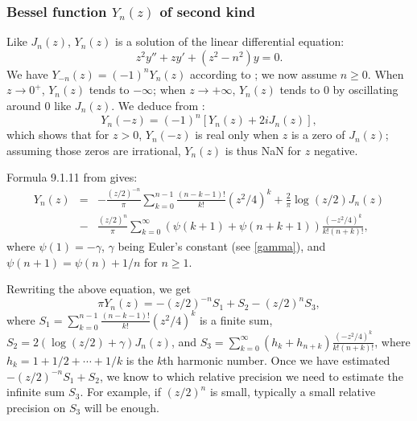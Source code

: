 \documentclass[12pt]{amsart}
\begin{document}
\subsubsection{Bessel function $Y_n(z)$ of second kind}

Like $J_n(z)$, $Y_n(z)$ is a solution of the linear differential equation:
\[ z^2 y'' + z y' + (z^2-n^2) y = 0. \]
We have $Y_{-n}(z) = (-1)^n Y_n(z)$ according to \cite[Eq.~(9.1.5)]{AbSt73};
we now assume $n \geq 0$.
When $z \rightarrow 0^+$, $Y_n(z)$ tends to $-\infty$; when $z \rightarrow
+\infty$, $Y_n(z)$ tends to $0$ by oscillating around $0$ like $J_n(z)$.
We deduce from \cite[Eq.~(9.23)]{Temme96}:
\[ Y_n(-z) = (-1)^n [Y_n(z) + 2 i J_n(z)], \]
which shows that for $z > 0$, $Y_n(-z)$ is real only when $z$ is a zero of
$J_n(z)$; assuming those zeros are irrational, $Y_n(z)$ is thus NaN for
$z$ negative.

Formula 9.1.11 from \cite{AbSt73} gives:
\begin{eqnarray*}
Y_n(z) &=& -\frac{(z/2)^{-n}}{\pi} \sum_{k=0}^{n-1} \frac{(n-k-1)!}{k!}
   (z^2/4)^k + \frac{2}{\pi} \log(z/2) J_n(z) \\ &-& \frac{(z/2)^n}{\pi}
  \sum_{k=0}^{\infty} (\psi(k+1) + \psi(n+k+1)) \frac{(-z^2/4)^k}{k! (n+k)!},
\end{eqnarray*}
where $\psi(1)=-\gamma$, $\gamma$ being Euler's constant (see
\textsection\ref{gamma}), and $\psi(n+1) = \psi(n) + 1/n$ for $n \geq 1$.

Rewriting the above equation, we get
\[ \pi Y_n(z) = -(z/2)^{-n} S_1 + S_2 - (z/2)^n S_3, \]
where $S_1 = \sum_{k=0}^{n-1} \frac{(n-k-1)!}{k!} (z^2/4)^k$ is
a finite sum,
$S_2 = 2 (\log(z/2) + \gamma) J_n(z)$, and
$S_3 = \sum_{k=0}^{\infty} (h_k + h_{n+k}) \frac{(-z^2/4)^k}{k! (n+k)!}$,
where $h_k = 1 + 1/2 + \cdots + 1/k$ is the $k$th harmonic number.
Once we have estimated $-(z/2)^{-n} S_1 + S_2$, we know to which relative
precision we need to estimate the infinite sum $S_3$. For example, if
$(z/2)^n$ is small, typically a small relative precision on $S_3$ will be
enough.
\end{document}
